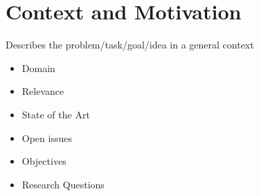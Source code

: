\section{Context and Motivation}
\label{sec:context}
Describes the problem/task/goal/idea in a general context

\begin{itemize}
\item Domain
\item Relevance
\item State of the Art
\item Open issues
\item Objectives
\item Research Questions
\end{itemize}